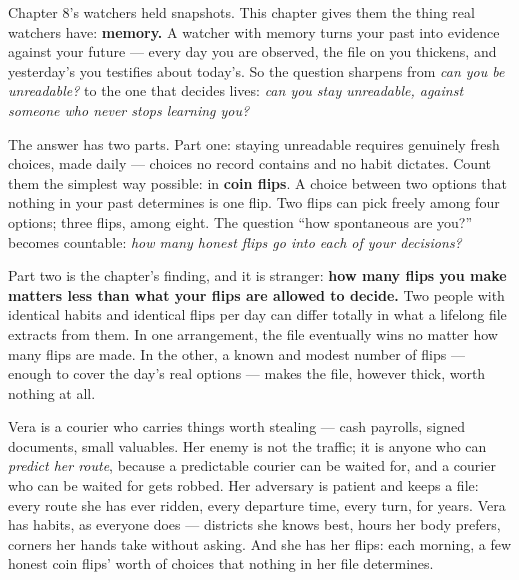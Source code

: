 


Chapter 8's watchers held snapshots. This chapter gives them the thing
real watchers have: \textbf{memory.} A watcher with memory turns your past
into evidence against your future --- every day you are observed, the
file on you thickens, and yesterday's you testifies about today's.
So the question sharpens from \emph{can you be unreadable?} to the one that
decides lives: \emph{can you stay unreadable, against someone who never
stops learning you?}

The answer has two parts. Part one: staying unreadable requires
genuinely fresh choices, made daily --- choices no record contains and
no habit dictates. Count them the simplest way possible: in
\textbf{coin flips}. A choice between two options that nothing in your past
determines is one flip. Two flips can pick freely among four options;
three flips, among eight. The question ``how spontaneous are you?''
becomes countable: \emph{how many honest flips go into each of your
decisions?}

Part two is the chapter's finding, and it is stranger: \textbf{how many
flips you make matters less than what your flips are allowed to
decide.} Two people with identical habits and identical flips per day
can differ totally in what a lifelong file extracts from them. In one
arrangement, the file eventually wins no matter how many flips are
made. In the other, a known and modest number of flips --- enough to
cover the day's real options --- makes the file, however thick, worth
nothing at all.


Vera is a courier who carries things worth stealing --- cash payrolls,
signed documents, small valuables. Her enemy is not the traffic; it is
anyone who can \emph{predict her route}, because a predictable courier can
be waited for, and a courier who can be waited for gets robbed. Her
adversary is patient and keeps a file: every route she has ever
ridden, every departure time, every turn, for years. Vera has habits,
as everyone does --- districts she knows best, hours her body prefers,
corners her hands take without asking. And she has her flips: each
morning, a few honest coin flips' worth of choices that nothing in her
file determines.

